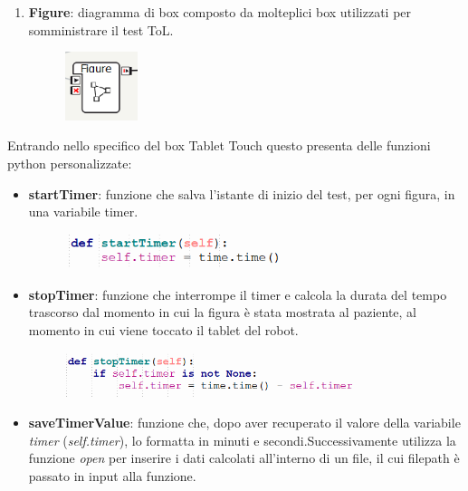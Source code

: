 \begin{sloppypar}
{\begin{enumerate}
\item \textbf{Figure}: diagramma di box composto da molteplici box utilizzati per somministrare
il test ToL.
\vspace{0.4cm}
\begin{figure}[H]
\centering
\includegraphics[width=0.2\textwidth]{immagini/figure.png}
\end{figure}
\vspace{0.4cm}
\end{enumerate}
Entrando nello specifico del box Tablet Touch questo presenta delle funzioni
python personalizzate:
\vspace{0.4cm}
\begin{itemize}
    \item \textbf{startTimer}: funzione che salva l’istante di inizio del test, per ogni figura,
in una variabile timer.
\vspace{0.6cm}
\begin{figure}[H]
\centering
\includegraphics[width=0.6\textwidth]{immagini/starttimer.png}
\end{figure}
\vspace{0.6cm}
\item \textbf{stopTimer}: funzione che interrompe il timer e calcola la durata del tempo
trascorso dal momento in cui la figura è stata mostrata al paziente, al momento
in cui viene toccato il tablet del robot.
\vspace{0.6cm}
\begin{figure}[H]
\centering
\includegraphics[width=0.8\textwidth]{immagini/stoptimer.png}
\end{figure}
\vspace{0.6cm}
\item \textbf{saveTimerValue}: funzione che, dopo aver recuperato il valore della variabile \textit{timer} (\textit{self.timer}), lo formatta in minuti e secondi.\newline Successivamente utilizza la funzione \textit{open} per inserire i dati calcolati all'interno di un file, il cui filepath è passato in input alla funzione.\newline

\end{itemize}}
\end{sloppypar}
